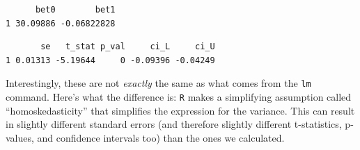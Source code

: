 \documentclass[
  letterpaper,
  DIV=11,
  numbers=noendperiod]{scrreprt}
\newenvironment{Shaded}{\begin{snugshade}}{\end{snugshade}}
\newcommand{\CommentTok}[1]{\textcolor[rgb]{0.37,0.37,0.37}{#1}}
\newcommand{\DecValTok}[1]{\textcolor[rgb]{0.68,0.00,0.00}{#1}}
\newcommand{\FloatTok}[1]{\textcolor[rgb]{0.68,0.00,0.00}{#1}}
\newcommand{\FunctionTok}[1]{\textcolor[rgb]{0.28,0.35,0.67}{#1}}
\newcommand{\NormalTok}[1]{\textcolor[rgb]{0.00,0.23,0.31}{#1}}
\newcommand{\OtherTok}[1]{\textcolor[rgb]{0.00,0.23,0.31}{#1}}
\newcommand{\SpecialCharTok}[1]{\textcolor[rgb]{0.37,0.37,0.37}{#1}}
\begin{document}
\begin{verbatim}
      bet0        bet1
1 30.09886 -0.06822828
\end{verbatim}

\begin{Shaded}
\end{Shaded}

\begin{verbatim}
       se   t_stat p_val     ci_L     ci_U
1 0.01313 -5.19644     0 -0.09396 -0.04249
\end{verbatim}

Interestingly, these are not \emph{exactly} the same as what comes from
the \texttt{lm} command. Here's what the difference is: \texttt{R} makes
a simplifying assumption called ``homoskedasticity'' that simplifies the
expression for the variance. This can result in slightly different
standard errors (and therefore slightly different t-statistics,
p-values, and confidence intervals too) than the ones we calculated.
\end{document}
